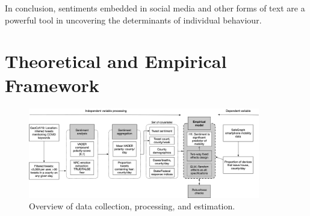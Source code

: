 \documentclass[12pt,a4]{article}
\begin{document}
In conclusion, sentiments embedded in social media and other forms of text are a powerful tool in uncovering the determinants of individual behaviour.



\section{Theoretical and Empirical Framework}\label{methods}
\begin{figure}[!htb]
  \centering
  \caption{Overview of data collection, processing, and estimation.}\label{process}
  \includegraphics[width=0.9\textwidth]{figs/processing.png}
\end{figure}
\end{document}
